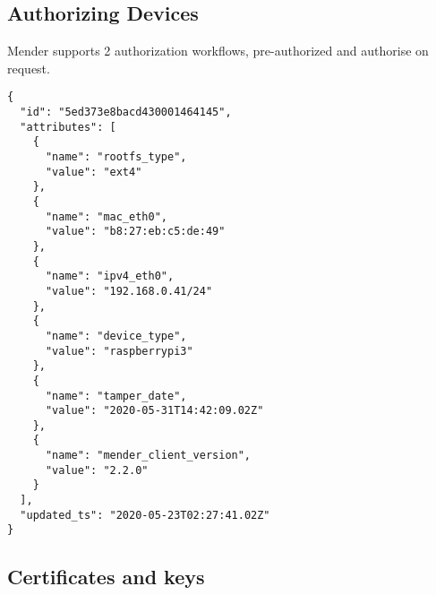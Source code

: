 \documentclass[../../main.tex]{subfiles}
\begin{document}
\subsection{Authorizing Devices}%
\label{sub:authorizing_devices}

Mender supports 2 authorization workflows, pre-authorized and authorise on request.


\begin{verbatim}
{
  "id": "5ed373e8bacd430001464145",
  "attributes": [
    {
      "name": "rootfs_type",
      "value": "ext4"
    },
    {
      "name": "mac_eth0",
      "value": "b8:27:eb:c5:de:49"
    },
    {
      "name": "ipv4_eth0",
      "value": "192.168.0.41/24"
    },
    {
      "name": "device_type",
      "value": "raspberrypi3"
    },
    {
      "name": "tamper_date",
      "value": "2020-05-31T14:42:09.02Z"
    },
    {
      "name": "mender_client_version",
      "value": "2.2.0"
    }
  ],
  "updated_ts": "2020-05-23T02:27:41.02Z"
}

\end{verbatim}




\subsection{Certificates and keys}%
\label{sub:certificates_and_keys}




%
%
%
%
	
\end{document}
